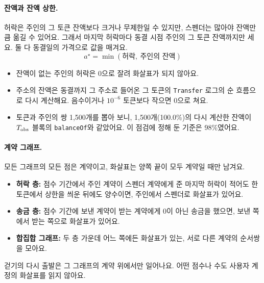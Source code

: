 \paragraph{잔액과 잔액 상한.}
허락은 주인의 그 토큰 잔액보다 크거나 무제한일 수 있지만, 스펜더는 많아야 잔액만큼 옮길 수 있어요. 그래서 마지막 허락마다 동결 시점 주인의 그 토큰 잔액까지만 세요. 둘 다 동결일의 가격으로 값을 매겨요.
\begin{equation}
\label{eq:cap}
a^{\star}=\min(\text{허락},\ \text{주인의 잔액})
\end{equation}
\begin{itemize}
\item 잔액이 없는 주인의 허락은 0으로 잘려 화살표가 되지 않아요.
\item 주소의 잔액은 동결까지 그 주소로 들어온 그 토큰의 \texttt{Transfer} 로그의 순 흐름으로 다시 계산해요. 음수이거나 $10^{-6}$ 토큰보다 작으면 0으로 쳐요.
\item 토큰과 주인의 쌍 1,500개를 뽑아 보니, 1,500개(100.0\%)의 다시 계산한 잔액이 $T_{\mathrm{obs}}$ 블록의 \texttt{balanceOf}와 같았어요. 이 점검에 정해 둔 기준은 98\%였어요.
\end{itemize}

\paragraph{계약 그래프.}
모든 그래프의 모든 점은 계약이고, 화살표는 양쪽 끝이 모두 계약일 때만 남겨요.
\begin{itemize}
\item \textbf{허락 층:} 점수 기간에서 주인 계약이 스펜더 계약에게 준 마지막 허락이 적어도 한 토큰에서 상한을 씌운 뒤에도 양수이면, 주인에서 스펜더로 화살표가 있어요.
\item \textbf{송금 층:} 점수 기간에 보낸 계약이 받는 계약에게 0이 아닌 송금을 했으면, 보낸 쪽에서 받는 쪽으로 화살표가 있어요.
\item \textbf{합집합 그래프:} 두 층 가운데 어느 쪽에든 화살표가 있는, 서로 다른 계약의 순서쌍을 모아요.
\end{itemize}
걷기의 다시 출발은 그 그래프의 계약 위에서만 일어나요. 어떤 점수나 수도 사용자 계정의 화살표를 읽지 않아요.

